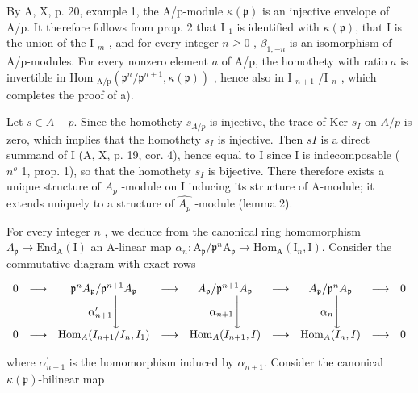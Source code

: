 By A, X, p. 20, example 1, the A/p-module \(\kappa(\mathfrak{p})\) is an injective envelope of A/p. It therefore follows from prop. 2 that I \(_1\) is identified with \(\kappa(\mathfrak{p})\), that I is the union of the I \(_m\) , and for every integer \(n \geqslant 0\) , \(\beta_{1,-n}\) is an isomorphism of A/p-modules. For every nonzero element \(a\) of A/p, the homothety with ratio \(a\) is invertible in Hom \(_{\text{A/p}}(\mathfrak{p}^n/\mathfrak{p}^{n+1}, \kappa(\mathfrak{p}))\) , hence also in I \(_{n+1}\) /I \(_n\) , which completes the proof of a).

Let \(s \in A - p\). Since the homothety \(s_{A/p}\) is injective, the trace of Ker \(s_I\) on \(A/p\) is zero, which implies that the homothety \(s_I\) is injective. Then \(sI\) is a direct summand of I (A, X, p. 19, cor. 4), hence equal to I since I is indecomposable ( \(n^o\) 1, prop. 1), so that the homothety \(s_I\) is bijective. There therefore exists a unique structure of \(A_p\) -module on I inducing its structure of A-module; it extends uniquely to a structure of \(\widehat{A_p}\) -module (lemma 2).

For every integer \(n\) , we deduce from the canonical ring homomorphism \(\Lambda_{\mathfrak{p}} \longrightarrow \mathrm{End}_{\mathrm{A}}(\mathrm{I})\) an A-linear map \(\alpha_{n}: \mathrm{A}_{\mathfrak{p}}/\mathfrak{p}^{n}\mathrm{A}_{\mathfrak{p}} \longrightarrow \mathrm{Hom}_{\mathrm{A}}(\mathrm{I}_{n},\mathrm{I})\). Consider the commutative diagram with exact rows

\[
\begin{array}{c c c c c c c c c} 0 & \longrightarrow & \mathfrak {p} ^ {n} A _ {\mathfrak {p}} / \mathfrak {p} ^ {n + 1} A _ {\mathfrak {p}} & \longrightarrow & A _ {\mathfrak {p}} / \mathfrak {p} ^ {n + 1} A _ {\mathfrak {p}} & \longrightarrow & A _ {\mathfrak {p}} / \mathfrak {p} ^ {n} A _ {\mathfrak {p}} & \longrightarrow & 0 \\ & & \alpha_ {n + 1} ^ {\prime} \Bigg \downarrow & & \alpha_ {n + 1} \Bigg \downarrow & & \alpha_ {n} \Bigg \downarrow \\ 0 & \longrightarrow & \operatorname{Hom} _ {A} (I _ {n + 1} / I _ {n}, I _ {1}) & \longrightarrow & \operatorname{Hom} _ {A} (I _ {n + 1}, I) & \longrightarrow & \operatorname{Hom} _ {A} (I _ {n}, I) & \longrightarrow & 0 \end{array}
\]

where \(\alpha_{n+1}^{\prime}\) is the homomorphism induced by \(\alpha_{n+1}\). Consider the canonical \(\kappa(\mathfrak{p})\)-bilinear map

